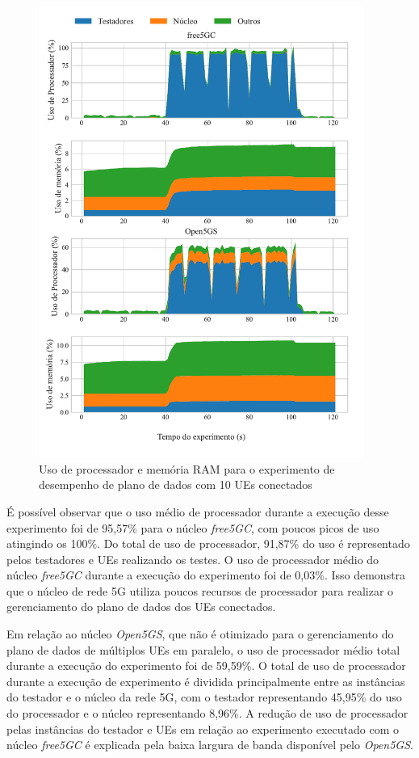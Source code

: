 \begin{figure}[H]
    \centering
    \includegraphics[width=0.95\textwidth]{TG2/Chapters/DataAnalysis/Figures/EXP2-IPERF-RES-10gNB-12C-8GB.pdf}
    \caption{Uso de processador e memória RAM para o experimento de desempenho de plano de dados com 10 UEs conectados}
    \label{fig:exp2_10gnb_12c}
\end{figure}

É possível observar que o uso médio de processador durante a execução desse experimento foi de 95,57\% para o núcleo \textit{free5GC}, com poucos picos de uso atingindo os 100\%.
Do total de uso de processador, 91,87\% do uso é representado pelos testadores e UEs realizando os testes.
O uso de processador médio do núcleo \textit{free5GC} durante a execução do experimento foi de 0,03\%.
Isso demonstra que o núcleo de rede 5G utiliza poucos recursos de processador para realizar o gerenciamento do plano de dados dos UEs conectados.

Em relação ao núcleo \textit{Open5GS}, que não é otimizado para o gerenciamento do plano de dados de múltiplos UEs em paralelo, o uso de processador médio total durante a execução do experimento foi de 59,59\%.
O total de uso de processador durante a execução de experimento é dividida principalmente entre as instâncias do testador e o núcleo da rede 5G, com o testador representando 45,95\% do uso do processador e o núcleo representando 8,96\%.
A redução de uso de processador pelas instâncias do testador e UEs em relação ao experimento executado com o núcleo \textit{free5GC} é explicada pela baixa largura de banda disponível pelo \textit{Open5GS}.

